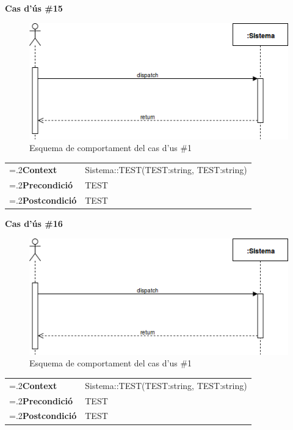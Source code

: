 \clearpage
\noindent\textbf{\large Cas d'ús \#15}\\
\begin{figure}[H]
\centering
\includegraphics[scale=0.6]{Figures/casdus_00.png}
\caption{Esquema de comportament del cas d'us \#1}
\end{figure}
\begin{table}[h]
\noindent
\begin{tabularx}{\linewidth}{
>{\hsize=.2\hsize}X%
>{\hsize=0.8\hsize}X%
}
\textbf{Context} 		& Sistema::TEST(TEST:string, TEST:string) \\
\textbf{Precondició} 	& TEST \\
\textbf{Postcondició}	& TEST \\
\end{tabularx}
\label{}
\end{table}

\noindent\textbf{\large Cas d'ús \#16}\\
\begin{figure}[H]
\centering
\includegraphics[scale=0.6]{Figures/casdus_00.png}
\caption{Esquema de comportament del cas d'us \#1}
\end{figure}
\begin{table}[h]
\noindent
\begin{tabularx}{\linewidth}{
>{\hsize=.2\hsize}X%
>{\hsize=0.8\hsize}X%
}
\textbf{Context} 		& Sistema::TEST(TEST:string, TEST:string) \\
\textbf{Precondició} 	& TEST \\
\textbf{Postcondició}	& TEST \\
\end{tabularx}
\label{}
\end{table}

